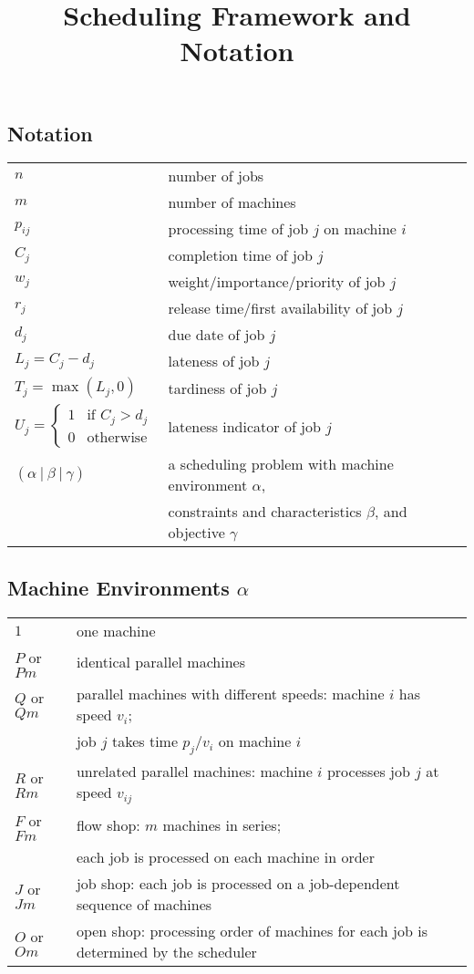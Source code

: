 \documentclass[11pt]{article}
\title{Scheduling Framework and Notation}
\date{}
\begin{document}
\maketitle
\subsection*{Notation}

\begin{tabular}{ll}
  $n$ & number of jobs \\
  $m$ & number of machines \\
  $p_{ij}$ & processing time of job $j$ on machine $i$ \\
  $C_j$ & completion time of job $j$ \\
  $w_j$ & weight/importance/priority of job $j$ \\
  $r_j$ & release time/first availability of job $j$ \\
  $d_j$ & due date of job $j$ \\
  $L_j = C_j-d_j$ & lateness of job $j$ \\
  $T_j = \max(L_j,0)$ & tardiness of job $j$ \\
  $ U_j = \left\{ \begin{array}{ll} 
        1 & \mbox{if $C_j > d_j$} \\
        0 & \mbox{otherwise}
      \end{array}\right.$
    & lateness indicator of job $j$ \\
    $(\alpha ~|~ \beta ~|~ \gamma)$ & a scheduling problem with machine
    environment $\alpha$, \\ &constraints and characteristics $\beta$, and
    objective $\gamma$
\end{tabular}

\subsection*{Machine Environments $\alpha$}

\begin{tabular}{ll}
  $1$ & one machine \\
  $P$ or $Pm$ & identical parallel machines \\
  $Q$ or $Qm$ & parallel machines with different speeds: machine
  $i$ has speed $v_i$;\\ & job $j$ takes time $p_j/v_i$ on machine $i$
  \\
  $R$ or $Rm$ & unrelated parallel machines: machine $i$ processes job
  $j$ at speed $v_{ij}$\\
  $F$ or $Fm$ & flow shop: $m$ machines in series; \\ & each job is
  processed on each machine in order\\
  $J$ or $Jm$ & job shop: each job is processed on a
  job-dependent sequence of machines\\
  $O$ or $Om$ & open shop: processing order of machines for each job is
  determined by the scheduler
\end{tabular}
\end{document}
